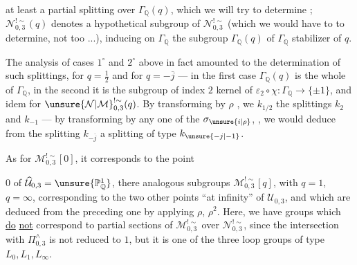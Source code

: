 
at least  a partial splitting over
$\Gamma_{\mathbb Q}(q)$, which we will try to determine ;
$\mathcal N_{0,3}^{!\sim}(q)$ denotes a hypothetical
subgroup of $\mathcal N_{0,3}^{!\sim}$
(which we would have to  to determine, 
 not too ...), inducing on $\Gamma_{\mathbb Q}$
the  subgroup $\Gamma_{\mathbb Q}(q)$ of
$\Gamma_{\mathbb Q}$ stabilizer of $q$.


The analysis of cases $1^\circ$ and $2^\circ$ above in fact amounted to
the determination of such splittings, for $q=\frac12$ and for
$q=-\overline j$ --- in the first case $\Gamma_{\mathbb Q}(q)$ is
the whole of $\Gamma_{\mathbb Q}$, in the second it is the subgroup
of index $2$ kernel of $\varepsilon_2\circ\chi:\Gamma_{\mathbb Q}
\longrightarrow\{\pm1\}$, and idem for
$\unsure{\mathcal N|\mathcal M}_{0,3}^{!\sim}(q)$.
By transforming by $\rho$ , we
  $k_{1/2}$
the splittings $k_2$ and $k_{-1}$ --- by transforming by any one
of the $\sigma_{\unsure{i|\rho}}$,
, we would deduce
from the splitting $k_{-\overline j}$ a splitting of type $k_{\unsure{-j|-1}}$.

As for $\mathcal M_{0,3}^{!\sim}[0]$, it corresponds
 to the point


$0$ of $\widehat{\mathcal U}_{0,3}=\unsure{\mathbb P^1_{\mathbb Q}}$,
there 
analogous subgroups $\mathcal M_{0,3}^{!\sim}[q]$, with
$q=1$, $q=\infty$, corresponding to the two other points ``at infinity''
of $\mathcal U_{0,3}$, and which are deduced from the preceding one by applying
$\rho$, $\rho^2$.
Here, we have groups which \uline{do} \uline{not} correspond
 to  partial sections
of $\mathcal M_{0,3}^{!\sim}$ over $\mathcal N_{0,3}^{!\sim}$,
since the intersection with $\Pi_{0,3}^{\wedge}$ is not reduced to $1$,
but it is one of the three loop groups of type $L_0,L_1,L_\infty$.

